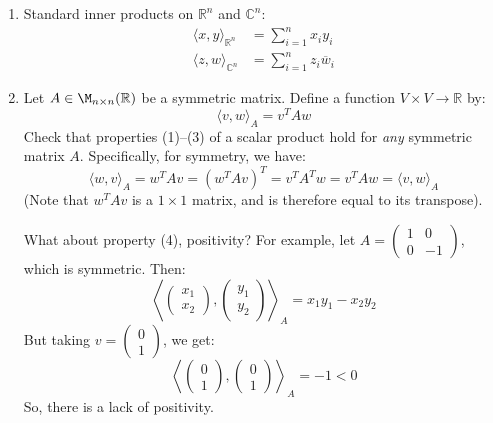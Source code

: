 \begin{example}
\leavevmode
\begin{enumerate}
    \item Standard inner products on $\mathbb{R}^n$ and $\mathbb{C}^n$:
    \begin{align*}
        \langle x, y \rangle_{\mathbb{R}^n} &= \sum_{i=1}^n x_i y_i \\
        \langle z, w \rangle_{\mathbb{C}^n} &= \sum_{i=1}^n z_i \overline{w}_i
    \end{align*}
    
    \item Let $A \in \M_{n \times n}(\mathbb{R})$ be a symmetric matrix. Define a function $V \times V \longrightarrow \mathbb{R}$ by:
    \[
        \langle v, w \rangle_A = v^T A w
    \]
    Check that properties (1)--(3) of a scalar product hold for \textit{any} symmetric matrix $A$. Specifically, for symmetry, we have:
    \[
        \langle w, v \rangle_A = w^T A v = (w^T A v)^T = v^T A^T w = v^T A w = \langle v, w \rangle_A
    \]
    (Note that $w^T A v$ is a $1 \times 1$ matrix, and is therefore equal to its transpose).
    
    What about property (4), positivity? For example, let $A = \begin{pmatrix} 1 & 0 \\ 0 & -1 \end{pmatrix}$, which is symmetric. Then:
    \[
        \left\langle \begin{pmatrix} x_1 \\ x_2 \end{pmatrix}, \begin{pmatrix} y_1 \\ y_2 \end{pmatrix} \right\rangle_A = x_1 y_1 - x_2 y_2
    \]
    But taking $v = \begin{pmatrix} 0 \\ 1 \end{pmatrix}$, we get:
    \[
        \left\langle \begin{pmatrix} 0 \\ 1 \end{pmatrix}, \begin{pmatrix} 0 \\ 1 \end{pmatrix} \right\rangle_A = -1 < 0
    \]
    So, there is a lack of positivity.
\end{enumerate}
\end{example}




